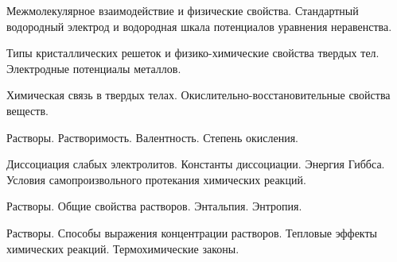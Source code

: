 \documentclass[
	14pt,
	a4paper,
	]
	{scrartcl}
\begin{document}
\shapk
{}
\setcounter{zad}{0}

\vfill
\z Межмолекулярное взаимодействие и физические свойства.
 \vfill
\z Стандартный водородный электрод и водородная шкала потенциалов уравнения неравенства.
 \vfill

\vfill

\newpage


\shapk
{}
\setcounter{zad}{0}

\vfill
\z Типы кристаллических решеток и физико-химические свойства твердых тел.
 \vfill
\z Электродные потенциалы металлов.
 \vfill

\vfill

\newpage


\shapk
{}
\setcounter{zad}{0}

\vfill
\z Химическая связь в твердых телах.
 \vfill
\z Окислительно-восстановительные свойства веществ.
 \vfill

\vfill

\newpage


\shapk
{}
\setcounter{zad}{0}

\vfill
\z Растворы. Растворимость.
 \vfill
\z Валентность. Степень  окисления.
 \vfill

\vfill

\newpage


\shapk
{}
\setcounter{zad}{0}

\vfill
\z Диссоциация слабых электролитов. Константы диссоциации.
 \vfill
\z Энергия Гиббса. Условия самопроизвольного протекания химических реакций.
 \vfill

\vfill

\newpage


\shapk
{}
\setcounter{zad}{0}

\vfill
\z Растворы. Общие свойства растворов.
 \vfill
\z Энтальпия. Энтропия.
 \vfill

\vfill

\newpage


\shapk
{}
\setcounter{zad}{0}

\vfill
\z Растворы. Способы выражения концентрации растворов.
 \vfill
\z Тепловые эффекты химических реакций. Термохимические законы.
 \vfill

\vfill

\newpage


\shapk
{}
\setcounter{zad}{0}
\end{document}
